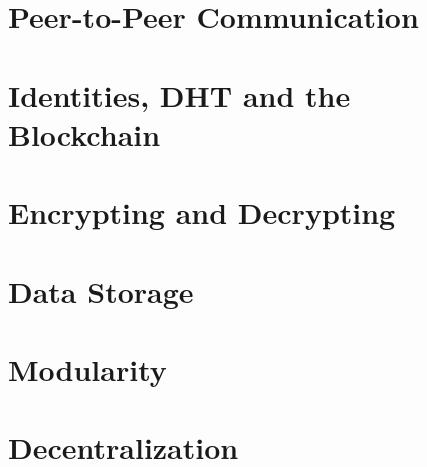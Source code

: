 \chapter{Peer-to-Peer Communication}

\chapter{Identities, DHT and the Blockchain}

\chapter{Encrypting and Decrypting}

\chapter{Data Storage}

\chapter{Modularity}

\chapter{Decentralization}
